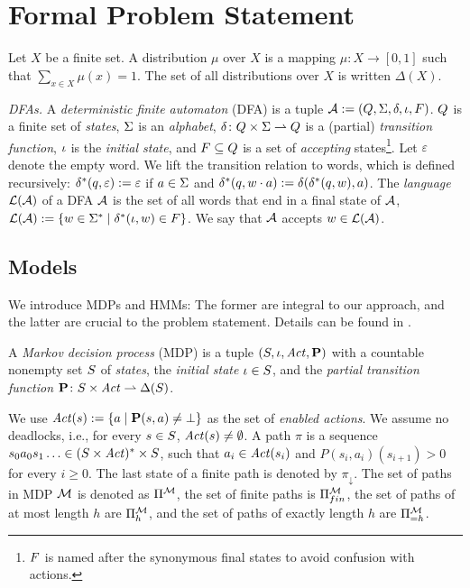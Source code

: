 \documentclass[runningheads]{llncs}
\newcommand{\Distr}{\Delta}
\newcommand{\act}{a}
\newcommand{\defeq}{:=}
\renewcommand{\paragraph}[1]{\smallskip\noindent\emph{#1}}
\begin{document}
\section{Formal Problem Statement}
Let $X$ be a finite set. A distribution $\mu$ over $X$ is a mapping $\mu\colon X \rightarrow [0,1]$ such that $\sum_{x \in X} \mu(x) = 1$. The set of all distributions over $X$ is written $\Distr(X)$.


\paragraph{DFAs.}
A \emph{deterministic finite automaton} (DFA) is a tuple $\dfa\defeq\left(\StsD, \alphabet, \trans, \init, \final\right)$. $Q$ is a finite set of \emph{states}, $\Sigma$ is an \emph{alphabet}, $\delta\colon Q \times \Sigma \rightharpoonup Q$ is a (partial) \emph{transition function}, $\iota$ is the \emph{initial state}, and $F \subseteq Q$ is a set of \emph{accepting} states\footnote{$F$ is named after the synonymous final states to avoid confusion with actions.}.
Let $\varepsilon$ denote the empty word. We lift the transition relation to words, which is defined recursively: $\trans^*(q, \varepsilon) \defeq \varepsilon$ if $a \in \Sigma$ and $\trans^*(q, w \cdot a) \defeq \trans(\trans^*(q,w), a)$. The \emph{language} $\mathcal{L}(\mathcal{A})$ of a DFA $\mathcal{A}$ is the set of all words that end in a final state of $\mathcal{A}$, $\lang{\dfa} \defeq \{ w \in \alphabet^* \mid \trans^*(\init, w) \in \final \}$. We say that $\mathcal{A}$ accepts $w \in \mathcal{L}(\mathcal{A})$.


\subsection{Models}
We introduce MDPs and HMMs: The former are integral to our approach, and the latter are crucial to the problem statement. Details can be found in \cite{baierPrinciplesModelChecking2008}.


\begin{definition}[MDP]
    A \emph{Markov decision process} (MDP) is a tuple $\left(S, \iota, \mathit{Act}, \mathbf{P} \right)$ with a  countable nonempty set  $S$ of \emph{states},  the \emph{initial state} $\iota \in S$, and the \emph{partial transition function} $\ptrans\colon \Sts \times \Act \rightharpoonup \Distr(\Sts)$.
\end{definition}
We use $\Act(s) \defeq \{ \act \mid \ptrans(s, \act) \neq \bot \}$ as the set of \emph{enabled actions}. We assume no deadlocks, i.e., for every $s \in S$, $\mathit{Act}(s) \neq \emptyset$.
A path $\pi$ is a sequence $s_0\act_0s_1\hdots \in (\Sts \times \Act)^{*} \times \Sts$, such that $a_i \in \mathit{Act}(s_i)$ and $P(s_i, a_i)(s_{i+1}) > 0$ for every $i \geq 0$. The last state of a finite path is denoted by $\pi_\downarrow$.
The set of paths in MDP $\mathcal{M}$ is denoted as $\Pi^{\mathcal{M}}$, the set of finite paths is $\Pi_{fin}^{\mathcal{M}}$, the set of paths of at most length $h$ are $\Pi_h^{\mathcal{M}}$, and the set of paths of exactly length $h$ are $\Pi_{=h}^{\mathcal{M}}$.
\end{document}
